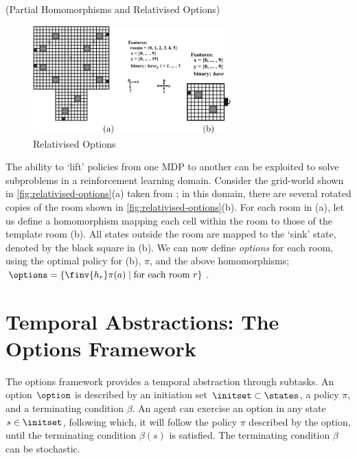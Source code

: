 \begin{note}(Partial Homomorphisms and Relativised Options)

  \begin{figure}[ht]
    \centering
    \includegraphics[width=3in]{figures/relativized-options.png}
    \caption{Relativised Options}
    \label{fig:relativised-options}
  \end{figure}

The ability to `lift' policies from one MDP to another can be exploited to
solve subproblems in a reinforcement learning domain. Consider the grid-world
shown in \autoref{fig:relativised-options}(a) taken from \cite{Ravindran2003};
in this domain, there are several rotated copies of the room shown in
\autoref{fig:relativised-options}(b). For each room in (a), let us define a
homomorphism mapping each cell within the room to those of the template room
(b). All states outside the room are mapped to the `sink' state, denoted by the
black square in (b). We can now define {\em options}
\cite{SuttonPrecupSingh1999} for each room, using the optimal policy for (b),
$\pi$, and the above homomorphisms; $\options = \{\finv{h_r}\pi(a) \mid \mbox{for
each room $r$} \}$.

\end{note}

\section{Temporal Abstractions: The Options Framework}
\label{sec:background:options}

The options framework provides a temporal abstraction through subtasks.
An option $\option$ is described by an initiation set $\initset \subset
\states$, a policy $\pi$, and a terminating condition $\beta$.  An agent
can exercise an option in any state $s \in \initset$, following which,
it will follow the policy $\pi$ described by the option, until the
terminating condition $\beta(s)$ is satisfied. The terminating condition
$\beta$ can be stochastic.

